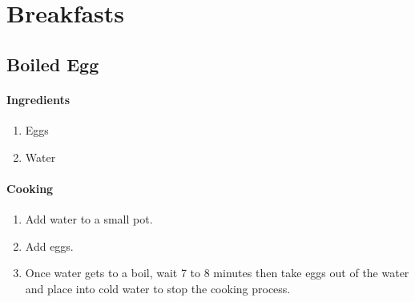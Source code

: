 \chapter{Breakfasts}
\section{Boiled Egg}
\subsubsection{Ingredients}
\begin{enumerate}
    \item Eggs
    \item Water
\end{enumerate}

\subsubsection{Cooking}
\begin{enumerate}
    \item Add water to a small pot.
    \item Add eggs.
    \item Once water gets to a boil, wait 7 to 8 minutes then take eggs out of the water and place into cold water to stop the cooking process.
\end{enumerate}
